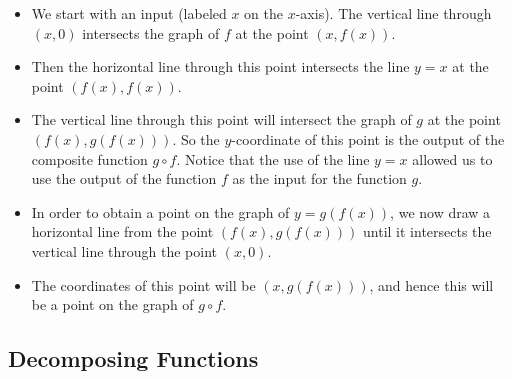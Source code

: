 \begin{itemize}
\item We start with an input (labeled  $x$  on the $x$-axis).  The vertical line through  $( {x, 0} )$ intersects the graph of  $f$  at the point  
$\left( {x, f( x )} \right)$.  

\item Then the horizontal line through this point intersects the line  $y = x$ at the point  
$\left( {f( x ), f( x )} \right)$.  

\item The vertical line through this point will intersect the graph of  $g$  at the point  
$\left( {f( x ), g( {f( x )} )} \right)$.  So the $y$-coordinate of this point is the output of the composite function  $g \circ f$\!.  Notice that the use of the line  $y = x$  allowed us to use the output of the function  $f$  as the input for the function  $g$.  

\item In order to obtain a point on the graph of  $y = g\left( {f( x )} \right)$, we now draw a horizontal line from the point  
$\left( {f( x ), g( {f( x )} )} \right)$ until it intersects the vertical line through the point  $( {x, 0} )$.  

\item The coordinates of this point will be  $\left( {x, g( {f( x )} )} \right)$, and hence this will be a point on the graph  of  $g \circ f$\!.
\end{itemize}
%
\subsection*{Decomposing Functions} %


